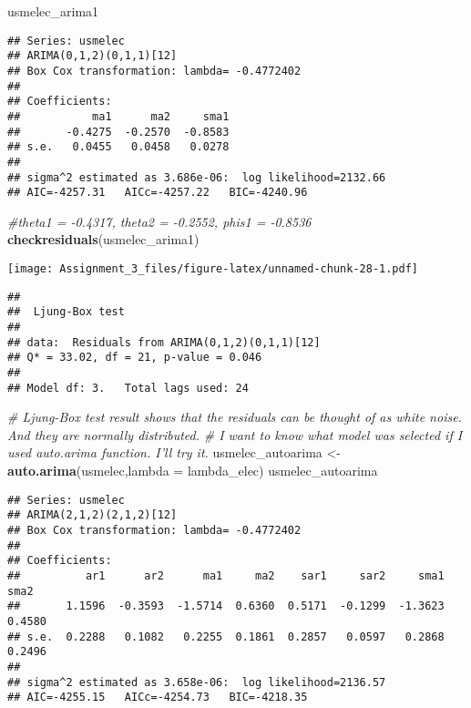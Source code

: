 \documentclass[]{article}
\newenvironment{Shaded}{\begin{snugshade}}{\end{snugshade}}
\newcommand{\KeywordTok}[1]{\textcolor[rgb]{0.13,0.29,0.53}{\textbf{#1}}}
\newcommand{\DataTypeTok}[1]{\textcolor[rgb]{0.13,0.29,0.53}{#1}}
\newcommand{\StringTok}[1]{\textcolor[rgb]{0.31,0.60,0.02}{#1}}
\newcommand{\CommentTok}[1]{\textcolor[rgb]{0.56,0.35,0.01}{\textit{#1}}}
\newcommand{\NormalTok}[1]{#1}
\begin{document}
\begin{Shaded}
\begin{Highlighting}[]
\NormalTok{usmelec_arima1}
\end{Highlighting}
\end{Shaded}

\begin{verbatim}
## Series: usmelec 
## ARIMA(0,1,2)(0,1,1)[12] 
## Box Cox transformation: lambda= -0.4772402 
## 
## Coefficients:
##           ma1      ma2     sma1
##       -0.4275  -0.2570  -0.8583
## s.e.   0.0455   0.0458   0.0278
## 
## sigma^2 estimated as 3.686e-06:  log likelihood=2132.66
## AIC=-4257.31   AICc=-4257.22   BIC=-4240.96
\end{verbatim}

\begin{Shaded}
\begin{Highlighting}[]
\CommentTok{#theta1 = -0.4317, theta2 = -0.2552, phis1 = -0.8536}
\KeywordTok{checkresiduals}\NormalTok{(usmelec_arima1)}
\end{Highlighting}
\end{Shaded}

\texttt{[image: Assignment\_3\_files/figure-latex/unnamed-chunk-28-1.pdf]}

\begin{verbatim}
## 
##  Ljung-Box test
## 
## data:  Residuals from ARIMA(0,1,2)(0,1,1)[12]
## Q* = 33.02, df = 21, p-value = 0.046
## 
## Model df: 3.   Total lags used: 24
\end{verbatim}

\begin{Shaded}
\begin{Highlighting}[]
\CommentTok{# Ljung-Box test result shows that the residuals can be thought of as white noise. And they are normally distributed.}
\CommentTok{# I want to know what model was selected if I used auto.arima function. I'll try it.}
\NormalTok{usmelec_autoarima <-}\StringTok{ }\KeywordTok{auto.arima}\NormalTok{(usmelec,}\DataTypeTok{lambda =}\NormalTok{ lambda_elec)}
\NormalTok{usmelec_autoarima}
\end{Highlighting}
\end{Shaded}

\begin{verbatim}
## Series: usmelec 
## ARIMA(2,1,2)(2,1,2)[12] 
## Box Cox transformation: lambda= -0.4772402 
## 
## Coefficients:
##          ar1      ar2      ma1     ma2    sar1     sar2     sma1    sma2
##       1.1596  -0.3593  -1.5714  0.6360  0.5171  -0.1299  -1.3623  0.4580
## s.e.  0.2288   0.1082   0.2255  0.1861  0.2857   0.0597   0.2868  0.2496
## 
## sigma^2 estimated as 3.658e-06:  log likelihood=2136.57
## AIC=-4255.15   AICc=-4254.73   BIC=-4218.35
\end{verbatim}
\end{document}
